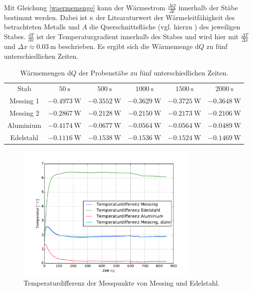 \noindent Mit Gleichung \eqref{waermemenge} kann der Wärmestrom $\frac{\Delta{Q}}{\Delta{t}}$ innerhalb der Stäbe bestimmt werden. 
Dabei ist $\kappa$ der Litearaturwert der Wärmeleitfähigkeit des betrachteten Metalls und $A$ die Querschnittsfläche (vgl. hierzu \cite{V204}) des jeweiligen Stabes.
$\frac{\partial T}{\partial x}$ ist der Temperaturgradient innerhalb des Stabes und wird hier mit $\frac{\Delta T}{\Delta x}$ und $\Delta x \approx \SI{0.03}{\meter}$ beschrieben.
Es ergibt sich die Wärmemenge $\mathup{d}Q$ zu fünf unterschiedlichen Zeiten.
\begin{table}
	\centering
	\begin{tabular}{cccccc}
	\sisetup{table-format=1.4}\\
\toprule
	Stab & $50\:\si\second$ & $500\:\si\second$ & $1000\:\si\second$ & $1500\:\si\second$ & $2000\:\si\second$ \\
	\midrule
	Messing 1 &$-0.4973\:\si{\watt}$ &$-0.3552\:\si{\watt}$&$-0.3629\:\si{\watt}$&$-0.3725\:\si{\watt}$&$-0.3648\:\si{\watt}$\\
	Messing 2 &$-0.2867\:\si{\watt}$& $-0.2128\:\si{\watt}$&$-0.2150\:\si{\watt}$&$-0.2173\:\si{\watt}$&$-0.2106\:\si{\watt}$\\
	Aluminium &$-0.4174\:\si{\watt}$&$-0.0677\:\si{\watt}$&$-0.0564\:\si{\watt}$&$-0.0564\:\si{\watt}$&$-0.0489\:\si{\watt}$\\
	Edelstahl &$-0.1116\:\si{\watt}$&$-0.1538\:\si{\watt}$&$-0.1536\:\si{\watt}$&$-0.1524\:\si{\watt}$&$-0.1469\:\si{\watt}$\\
	\bottomrule
	\end{tabular}
	\caption{Wärmemengen d$Q$ der Probenstäbe zu fünf unterschiedlichen Zeiten.}
	\label{tab:waememengen}
\end{table}
\begin{figure}
	\centering
	\includegraphics[width=0.8\textwidth]{Bilder/M1_Tempdiff.pdf}
	\caption{Temperaturdifferenz der Messpunkte von Messing und Edelstahl.}
	\label{fig:tempverl}
\end{figure}

